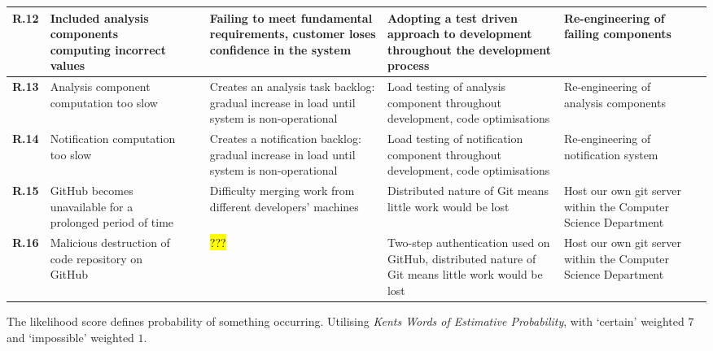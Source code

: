 \begin{longtable}[H]{| p{0.65cm} | p{2cm} | p{0.3cm} | p{0.3cm} | p{2.4cm} | p{3cm} | p{2.7cm} | p{0.4cm} |}
  \hline \textbf{R.12}
  & Included analysis components computing incorrect values
  & 
  & 
  & Failing to meet fundamental requirements, customer loses confidence in the system
  & Adopting a test driven approach to development throughout the development process
  & Re-engineering of failing components
  & \\
  
  \hline \textbf{R.13}
  & Analysis component computation too slow
  & 
  & 
  & Creates an analysis task backlog: gradual increase in load until system
  is non-operational
  & Load testing of analysis component throughout development, code optimisations 
  & Re-engineering of analysis components
  & \\  
  
  \hline \textbf{R.14}
  & Notification computation too slow
  & 
  & 
  & Creates a notification backlog: gradual increase in load until system
  is non-operational
  & Load testing of notification component throughout development, code optimisations 
  & Re-engineering of notification system
  & \\
  
  \hline \textbf{R.15}
  & GitHub becomes unavailable for a prolonged period of time
  & 
  & 
  & Difficulty merging work from different developers' machines
  & Distributed nature of Git means little work would be lost
  & Host our own git server within the Computer Science Department
  & \\ 
  
  \hline \textbf{R.16}
  & Malicious destruction of code repository on GitHub
  & 
  & 
  & \hl{???}
  & Two-step authentication used on GitHub, distributed nature of Git means little work would be lost
  & Host our own git server within the Computer Science Department
  & \\    
    
  \hline
\end{longtable}       

The likelihood score defines probability of something occurring. Utilising
\textit{Kents Words of Estimative Probability}\cite{kent1966strategic}, with
`certain' weighted $7$ and `impossible' weighted $1$.

